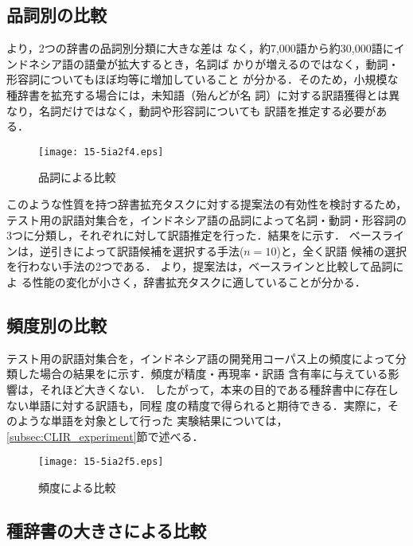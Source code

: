 \documentclass[japanese]{jnlp_1.4}
\newcommand{\tabref}[1]{}
\newcommand{\figref}[1]{}
\begin{document}
\subsection{品詞別の比較}
\label{subsec:辞書の分析}

\tabref{tbl:語彙サイズと品詞分布}より，2つの辞書の品詞別分類に大きな差は
なく，約7,000語から約30,000語にインドネシア語の語彙が拡大するとき，名詞ば
かりが増えるのではなく，動詞・形容詞についてもほぼ均等に増加していること
が分かる．そのため，小規模な種辞書を拡充する場合には，未知語（殆んどが名
詞）に対する訳語獲得とは異なり，名詞だけではなく，動詞や形容詞についても
訳語を推定する必要がある．

\begin{figure}[b]
  \begin{center}
   \texttt{[image: 15-5ia2f4.eps]}
  \end{center}
  \caption{品詞による比較}
  \label{fig:品詞による比較}
\end{figure}

このような性質を持つ辞書拡充タスクに対する提案法の有効性を検討するため，
テスト用の訳語対集合を，インドネシア語の品詞によって名詞・動詞・形容詞の
3つに分類し，それぞれに対して訳語推定を行った．結果を\figref{fig:品詞によ
る比較}に示す．
ベースラインは，逆引きによって訳語候補を選択する手法($n=10$)と，全く訳語
候補の選択を行わない手法の2つである．
\figref{fig:品詞による比較}より，提案法は，ベースラインと比較して品詞によ
る性能の変化が小さく，辞書拡充タスクに適していることが分かる．


\subsection{頻度別の比較}

テスト用の訳語対集合を，インドネシア語の開発用コーパス上の頻度によって分
類した場合の結果を\figref{fig:頻度の比較}に示す．頻度が精度・再現率・訳語
含有率に与えている影響は，それほど大きくない．
したがって，本来の目的である種辞書中に存在しない単語に対する訳語も，同程
度の精度で得られると期待できる．実際に，そのような単語を対象として行った
実験結果については，\ref{subsec:CLIR_experiment}節で述べる．

\begin{figure}[b]
  \begin{center}
   \texttt{[image: 15-5ia2f5.eps]}
  \end{center}
  \caption{頻度による比較}
  \label{fig:頻度の比較}
\end{figure}


\subsection{種辞書の大きさによる比較}
\label{subsec:seed_compare}
\end{document}
